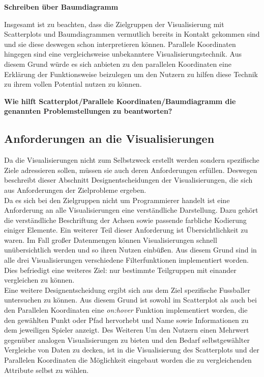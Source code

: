 \documentclass[usegeometry=true]{scrartcl}
\begin{document}
\textbf{Schreiben über Baumdiagramm}

Insgesamt ist zu beachten, dass die Zielgruppen der Visualisierung mit Scatterplots und Baumdiagrammen vermutlich bereits in Kontakt gekommen sind und sie diese deswegen schon interpretieren können. Parallele Koordinaten hingegen sind eine vergleichsweise unbekanntere Visualisierungstechnik. Aus diesem Grund würde es sich anbieten zu den parallelen Koordinaten eine Erklärung der Funktionsweise beizulegen um den Nutzern zu hilfen diese Technik zu ihrem vollen Potential nutzen zu können.


\textbf{Wie hilft Scatterplot/Parallele Koordinaten/Baumdiagramm die genannten Problemstellungen zu beantworten?}
\subsection{Anforderungen an die Visualisierungen}
Da die Visualisierungen nicht zum Selbstzweck erstellt werden sondern spezifische Ziele adressieren sollen, müssen sie auch deren Anforderungen erfüllen. Deswegen beschreibt dieser Abschnitt Designentscheidungen der Visualisierungen, die sich aus Anforderungen der Zielprobleme ergeben.\\
Da es sich bei den Zielgruppen nicht um Programmierer handelt ist eine Anforderung an alle Visualisierungen eine verständliche Darstellung. Dazu gehört die verständliche Beschriftung der Achsen sowie passende farbliche Kodierung einiger Elemente. Ein weiterer Teil dieser Anforderung ist Übersichtlichkeit zu waren. Im Fall großer Datenmengen können Visualisierungen schnell unübersichtlich werden und so ihren Nutzen einbüßen. Aus diesem Grund sind in alle drei Visualisierungen verschiedene Filterfunktionen implementiert worden. Dies befriedigt eine weiteres Ziel: nur bestimmte Teilgruppen mit einander vergleichen zu können.\\
Eine weitere Designentscheidung ergibt sich aus dem Ziel spezifische Fussballer untersuchen zu können. Aus diesem Grund ist sowohl im Scatterplot als auch bei den Parallelen Koordinaten eine \textit{on:hover} Funktion implementiert worden, die den gewählten Punkt oder Pfad hervorhebt und Name sowie Informationen zu dem jeweiligen Spieler anzeigt.
Des Weiteren 
Um den Nutzern einen Mehrwert gegenüber analogen Visualisierungen zu bieten und den Bedarf selbstgewählter Vergleiche von Daten zu decken, ist in die Visualisierung des Scatterplots und der Parallelen Koordinaten die Möglichkeit eingebaut worden die zu vergleichenden Attribute selbst zu wählen.
\end{document}
